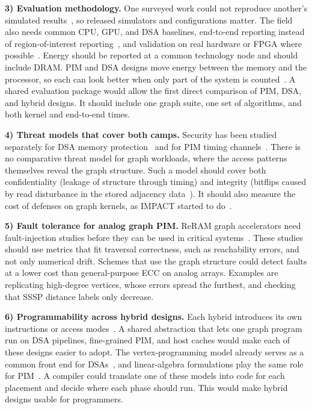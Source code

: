 \documentclass[journal,onecolumn]{IEEEtran}
\begin{document}
\textbf{3) Evaluation methodology.} One surveyed work could not reproduce another's simulated results~\cite{orenesvera2023dalorex}, so released simulators and configurations matter. The field also needs common CPU, GPU, and DSA baselines, end-to-end reporting instead of region-of-interest reporting~\cite{yenimol2026cograf}, and validation on real hardware or FPGA where possible~\cite{shin2025piccolo,chen2022regraph}. Energy should be reported at a common technology node and should include DRAM. PIM and DSA designs move energy between the memory and the processor, so each can look better when only part of the system is counted~\cite{yenimol2026cograf,ham2016graphicionado}. A shared evaluation package would allow the first direct comparison of PIM, DSA, and hybrid designs. It should include one graph suite, one set of algorithms, and both kernel and end-to-end times.

\textbf{4) Threat models that cover both camps.} Security has been studied separately for DSA memory protection~\cite{hua2022mgx} and for PIM timing channels~\cite{bostanci2025impact}. There is no comparative threat model for graph workloads, where the access patterns themselves reveal the graph structure. Such a model should cover both confidentiality (leakage of structure through timing) and integrity (bitflips caused by read disturbance in the stored adjacency data~\cite{yuksel2026pid}). It should also measure the cost of defenses on graph kernels, as IMPACT started to do~\cite{bostanci2025impact}.

\textbf{5) Fault tolerance for analog graph PIM.} ReRAM graph accelerators need fault-injection studies before they can be used in critical systems~\cite{song2018graphr,zheng2020spara}. These studies should use metrics that fit traversal correctness, such as reachability errors, and not only numerical drift. Schemes that use the graph structure could detect faults at a lower cost than general-purpose ECC on analog arrays. Examples are replicating high-degree vertices, whose errors spread the furthest, and checking that SSSP distance labels only decrease.

\textbf{6) Programmability across hybrid designs.} Each hybrid introduces its own instructions or access modes~\cite{shin2025piccolo,shin2025fala,yenimol2026cograf}. A shared abstraction that lets one graph program run on DSA pipelines, fine-grained PIM, and host caches would make each of these designs easier to adopt. The vertex-programming model already serves as a common front end for DSAs~\cite{ham2016graphicionado}, and linear-algebra formulations play the same role for PIM~\cite{barkhordar2025alphapim}. A compiler could translate one of these models into code for each placement and decide where each phase should run. This would make hybrid designs usable for programmers.
\end{document}
